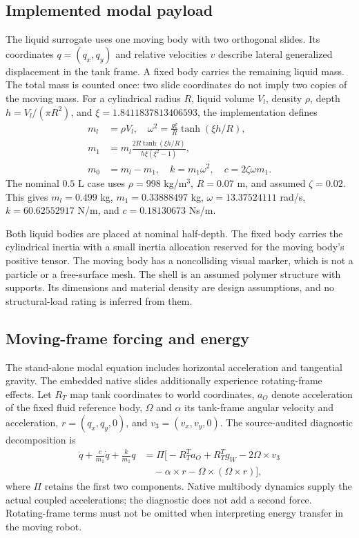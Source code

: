 \subsection{Implemented modal payload}
The liquid surrogate uses one moving body with two orthogonal slides. Its coordinates $q=(q_x,q_y)$ and relative velocities $v$ describe lateral generalized displacement in the tank frame. A fixed body carries the remaining liquid mass. The total mass is counted once: two slide coordinates do not imply two copies of the moving mass. For a cylindrical radius $R$, liquid volume $V_l$, density $\rho$, depth $h=V_l/(\pi R^2)$, and $\xi=1.8411837813406593$, the implementation defines
\begin{align}
 m_l&=\rho V_l,\quad \omega^2=\frac{g\xi}{R}\tanh(\xi h/R),\\
 m_1&=m_l\frac{2R\tanh(\xi h/R)}{h\xi(\xi^2-1)},\\
 m_0&=m_l-m_1,\quad k=m_1\omega^2,\quad c=2\zeta\omega m_1.
\end{align}
The nominal $0.5$ L case uses $\rho=998$ kg/m$^3$, $R=0.07$ m, and assumed $\zeta=0.02$. This gives $m_l=0.499$ kg, $m_1=0.33888497$ kg, $\omega=13.37524111$ rad/s, $k=60.62552917$ N/m, and $c=0.18130673$ Ns/m.

Both liquid bodies are placed at nominal half-depth. The fixed body carries the cylindrical inertia with a small inertia allocation reserved for the moving body's positive tensor. The moving body has a noncolliding visual marker, which is not a particle or a free-surface mesh. The shell is an assumed polymer structure with supports. Its dimensions and material density are design assumptions, and no structural-load rating is inferred from them.

\subsection{Moving-frame forcing and energy}
The stand-alone modal equation includes horizontal acceleration and tangential gravity. The embedded native slides additionally experience rotating-frame effects. Let $R_T$ map tank coordinates to world coordinates, $a_O$ denote acceleration of the fixed fluid reference body, $\Omega$ and $\alpha$ its tank-frame angular velocity and acceleration, $r=(q_x,q_y,0)$, and $v_3=(v_x,v_y,0)$. The source-audited diagnostic decomposition is
\begin{align}
 \ddot q+\frac{c}{m_1}\dot q+\frac{k}{m_1}q
 &=\Pi\big[-R_T^Ta_O+R_T^Tg_W-2\Omega\times v_3\nonumber\\
 &\quad-\alpha\times r-\Omega\times(\Omega\times r)\big],
\end{align}
where $\Pi$ retains the first two components. Native multibody dynamics supply the actual coupled accelerations; the diagnostic does not add a second force. Rotating-frame terms must not be omitted when interpreting energy transfer in the moving robot.

